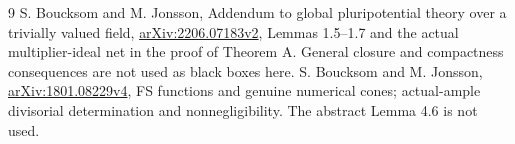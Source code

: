\documentclass[10pt]{article}
\begin{document}
\begin{thebibliography}{9}
 S. Boucksom and M. Jonsson,
Addendum to global pluripotential theory over a trivially valued field,
\href{https://arxiv.org/pdf/2206.07183v2}{arXiv:2206.07183v2},
Lemmas 1.5--1.7 and the actual multiplier-ideal net in the proof of
Theorem A. General closure and compactness consequences are not used
as black boxes here.
 S. Boucksom and M. Jonsson,
\href{https://arxiv.org/pdf/1801.08229v4}{arXiv:1801.08229v4},
FS functions and genuine numerical cones; actual-ample divisorial
determination and nonnegligibility. The abstract Lemma 4.6 is not used.
\end{thebibliography}
\end{document}
